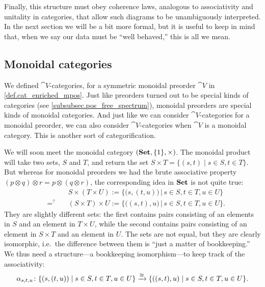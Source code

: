 \documentclass[7Sketches]{subfiles}
\begin{document}
Finally, this structure must obey coherence laws, analogous to associativity and
unitality in categories, that allow such diagrams to be unambiguously
interpreted. In the next section we will be a bit more formal, but it is useful
to keep in mind that, when we say our data must be ``well behaved,'' this is all we
mean.
%
%
%

\subsection{Monoidal categories}%

We defined $\cat{V}$-categories, for a symmetric monoidal preorder $\cat{V}$ in \cref{def.cat_enriched_mpos}. Just like preorders turned out to be special kinds of categories (see \cref{subsubsec.pos_free_spectrum}), monoidal preorders are special kinds of monoidal categories. And just like we can consider $\cat{V}$-categories for a monoidal preorder, we can also consider $\cat{V}$-categories when $\cat{V}$ is a monoidal category. This is another sort of categorification.

We will soon meet the monoidal category $(\mathbf{Set},\{1\},\times)$. The monoidal
product will take two sets, $S$ and $T$, and return the set $S\times
T=\{(s,t)\mid s\in S, t\in T\}$. But whereas for monoidal preorders we had the
brute associative property $(p\otimes q)\otimes r=p\otimes (q\otimes r)$, the
corresponding idea in $\mathbf{Set}$ is not quite true:%
\begin{align*}
& S \times (T \times U) :=\big\{\big(s,(t,u)\big)\,\big|\, s\in S, t\in T, u\in U\big\}
	\\
	\quad =^?\quad &
(S \times T) \times U:=\big\{\big((s,t),u\big)\,\big|\, s\in S, t\in T, u\in U\big\}.
\end{align*}
They are slightly different sets: the first contains pairs consisting of an
elements in $S$ and an element in $T\times U$, while the second contains pairs
consisting of an element in $S \times T$ and an element in $U$. The sets are not
equal, but they are clearly isomorphic, i.e.\ the difference between them is
``just a matter of bookkeeping.'' We thus need a structure---a bookkeeping
isomorphism---to keep track of the associativity:
\[
	\alpha_{s,t,u}\colon\{(s,(t,u))\mid s\in S, t\in T, u\in U\}
	\xrightarrow{\cong}
	\{((s,t),u)\mid s\in S, t\in T, u\in U\}.
\]
%
\end{document}
